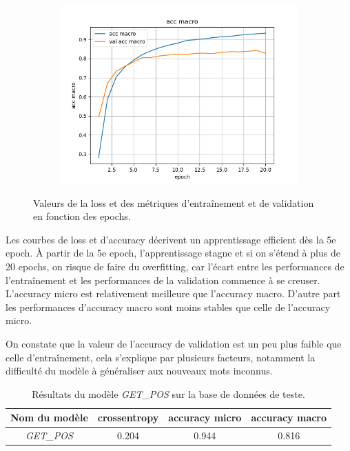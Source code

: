 \documentclass[a4paper]{article}
\begin{document}
\begin{figure}[H]
\begin{subfigure}{0.32\textwidth}
        \includegraphics[width=\linewidth]{../logs/get_pos_French/acc macro.png}
    \end{subfigure}
    \caption{Valeurs de la loss et des métriques d'entraînement et de validation en fonction des epochs.}
\end{figure}

Les courbes de loss et d'accuracy décrivent un apprentissage efficient dès la 5e epoch. À partir de la 5e epoch, l'apprentissage
stagne et si on s'étend à plus de 20 epochs, on risque de faire du overfitting, car l'écart entre les performances de l'entraînement
et les performances de la validation commence à se creuser. 
L'accuracy micro est relativement meilleure que l'accuracy macro. D'autre part les performances d'accuracy macro sont moins stables que celle de l'accuracy micro. 

On constate que la valeur de l'accuracy de validation est un peu plus faible que celle d'entraînement, cela 
s'explique par plusieurs facteurs, notamment la difficulté du modèle à généraliser aux nouveaux mots inconnus.


\begin{table}
    \centering
    \begin{tabular}{|c|c|c|c|}
        \hline
        Nom du modèle & crossentropy & accuracy micro & accuracy macro \\
        \hline
        \textit{GET\_POS} & 0.204 & 0.944 & 0.816\\
        \hline
    \end{tabular}
    \caption{Résultats du modèle \textit{GET\_POS} sur la base de données de teste.}
    \label{tab:test getpos}
\end{table}
\end{document}
